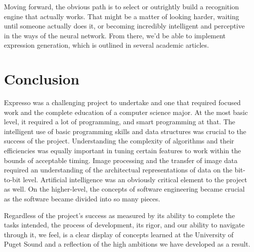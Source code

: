 \documentclass{acm_proc_article-sp}
\begin{document}
Moving forward, the obvious path is to select or outrightly build a recognition engine that actually works. That might be a matter of looking harder, waiting until someone actually does it, or becoming incredibly intelligent and perceptive in the ways of the neural network. From there, we'd be able to implement expression generation, which is outlined in several academic articles.

\section{Conclusion}
Expresso was a challenging project to undertake and one that required focused work and the complete education of a computer science major. At the most basic level, it required a lot of programming, and smart programming at that. The intelligent use of basic programming skills and data structures was crucial to the success of the project. Understanding the complexity of algorithms and their efficiencies was equally important in tuning certain features to work within the bounds of acceptable timing. Image processing and the transfer of image data required an understanding of the architectual representations of data on the bit-to-bit level. Artificial intelligence was an obviously critical element to the project as well. On the higher-level, the concepts of software engineering became crucial as the software became divided into so many pieces. 

Regardless of the project's success as measured by its ability to complete the tasks intended, the process of development, its rigor, and our ability to navigate through it, we feel, is a clear display of concepts learned at the University of Puget Sound and a reflection of the high ambitions we have developed as a result.



  
%
%


\balancecolumns

\end{document}
